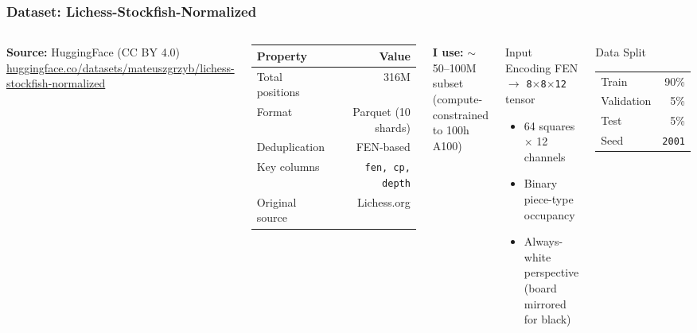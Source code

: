 \documentclass{beamer}
\begin{document}
\begin{frame}
\frametitle{Dataset: Lichess-Stockfish-Normalized}

\begin{columns}
\textbf{Source:} HuggingFace (CC BY 4.0)\\
{\footnotesize\url{huggingface.co/datasets/mateuszgrzyb/lichess-stockfish-normalized}}

\vspace{0.5em}
\begin{table}
\centering
\footnotesize
\begin{tabular}{lr}
\toprule
\textbf{Property} & \textbf{Value} \\
\midrule
Total positions & 316M \\
Format & Parquet (10 shards) \\
Deduplication & FEN-based \\
Key columns & \texttt{fen, cp, depth} \\
Original source & Lichess.org \\
\bottomrule
\end{tabular}
\end{table}

\vspace{0.3em}
\textbf{I use:} $\sim$50--100M subset\\(compute-constrained to 100h A100)

\begin{block}{Input Encoding}
FEN $\rightarrow$ \texttt{8$\times$8$\times$12} tensor

\vspace{0.3em}
\footnotesize
\begin{itemize}
    \item 64 squares $\times$ 12 channels
    \item Binary piece-type occupancy
    \item Always-white perspective\\(board mirrored for black)
\end{itemize}
\end{block}

\vspace{0.5em}
\begin{block}{Data Split}
\begin{tabular}{lr}
Train & 90\% \\
Validation & 5\% \\
Test & 5\% \\
Seed & \texttt{2001} \\
\end{tabular}
\end{block}
\end{columns}

\end{frame}
\end{document}
